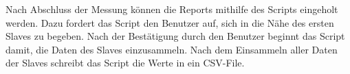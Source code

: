 Nach Abschluss der Messung können die Reports mithilfe des Scripts eingeholt werden.
Dazu fordert das Script den Benutzer auf, sich in die Nähe des ersten Slaves zu begeben.
Nach der Bestätigung durch den Benutzer beginnt das Script damit, die Daten des Slaves einzusammeln.
Nach dem Einsammeln aller Daten der Slaves schreibt das Script die Werte in ein CSV-File. 


